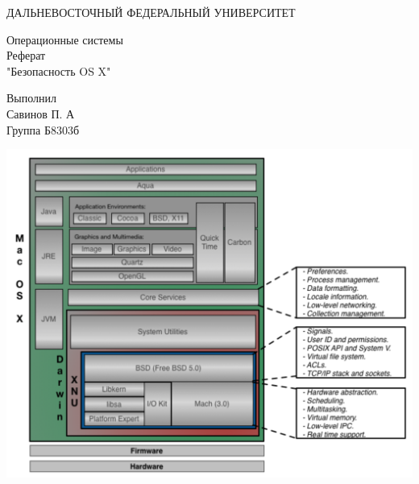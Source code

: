 \documentclass[12pt, a4paper]{article}
\begin{document}

  \begin{titlepage}
    \begin{center}
      \vspace{0.5cm}

      ДАЛЬНЕВОСТОЧНЫЙ ФЕДЕРАЛЬНЫЙ УНИВЕРСИТЕТ
      \vspace{5cm}

      {\LARGE Операционные системы\\
        \vspace{1cm}
        Реферат\\
        "Безопасность OS X"}
      \bigskip
    \end{center}

    \vspace{8cm}
    \begin{flushright}
    {\large
      Выполнил \\
      Савинов П. А\\
      Группа Б8303б}
    \end{flushright}
  \end{titlepage}

\renewcommand{\contentsname}{Содержание}
\renewcommand{\refname}{Список литературы}

\tableofcontents
\newpage


\begin{center}
\includegraphics[width=\textwidth]{structure}
\end{center}
\end{document}
